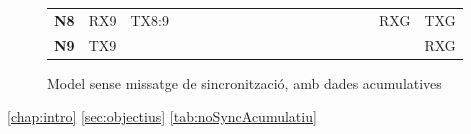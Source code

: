 \documentclass{tfgitic}[2024/07/01]
\begin{document}
\begin{figure}
{\begin{tabular}{l||cccccccccccccccccc}
            \cline{2-4}\cline{17-19}
            \textbf{N8} & \multicolumn{1}{c|}{RX9} & \multicolumn{1}{c|}{TX8:9} &                            &                            &                            &                            &                            &                            &                            &                                                              &                                                              &                                                              &                                                              &                          &                          & \multicolumn{1}{c|}{}    & \multicolumn{1}{c|}{RXG} & \multicolumn{1}{c|}{TXG}  \\ 
            \cline{2-3}\cline{18-19}
            \textcolor[rgb]{0.1,1,0.2}{\textbf{N9}} & \multicolumn{1}{c|}{TX9} &                            &                            &                            &                            &                            &                            &                            &                            &                                                              &                                                              &                                                              &                                                              &                          &                          &                          & \multicolumn{1}{c|}{}    & \multicolumn{1}{c|}{RXG}  \\
            \cline{2-2}\cline{19-19}
        \end{tabular}
    }
    \caption{Model sense missatge de sincronització, amb dades acumulatives}
    \label{fig:noSyncAcumulatiu}
\end{figure}

\autoref{chap:intro}
\autoref{sec:objectius}
\autoref{tab:noSyncAcumulatiu}

\listoftables
\listoffigures

\printbibliography


\end{document}
